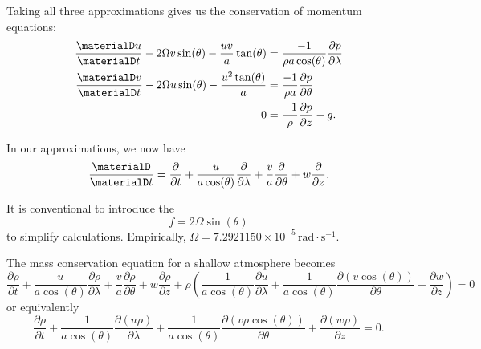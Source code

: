 \begin{prop}
Taking all three approximations gives us the conservation of momentum equations:
\begin{subequations}
  \begin{align}
    \frac{\materialD u}{\materialD t}
    - 2\Omega v\sin(\theta) - \frac{uv}{a}\tan(\theta)
    &= \frac{-1}{\rho a\cos(\theta)}\frac{\partial p}{\partial\lambda}\\
    \frac{\materialD v}{\materialD t}
    - 2\Omega u\sin(\theta) - \frac{u^{2}\tan(\theta)}{a}
    &= \frac{-1}{\rho a}\frac{\partial p}{\partial\theta} \\
    0 &= \frac{-1}{\rho}\frac{\partial p}{\partial z}-g.
  \end{align}
\end{subequations}
\end{prop}

\begin{note}
In our approximations, we now have
\begin{equation}
  \frac{\materialD}{\materialD t}=\frac{\partial}{\partial t} +
  \frac{u}{a\cos(\theta)}\frac{\partial}{\partial\lambda} +
  \frac{v}{a}\frac{\partial}{\partial\theta} + w\frac{\partial}{\partial z}.
\end{equation}
\end{note}

\begin{defn}
It is conventional to introduce the 
\begin{equation}
  f = 2\Omega\sin(\theta)
\end{equation}
to simplify calculations. Empirically, $\Omega=7.2921150\times10^{-5}\,\mathrm{rad}\cdot\mathrm{s}^{-1}$.
\end{defn}


\begin{prop}
The mass conservation equation for a shallow atmosphere becomes
\begin{equation}
  \frac{\partial\rho}{\partial t}
  + \frac{u}{a\cos(\theta)}\frac{\partial\rho}{\partial\lambda}
  + \frac{v}{a}\frac{\partial\rho}{\partial\theta}
  + w\frac{\partial\rho}{\partial z}
  + \rho\left(\frac{1}{a\cos(\theta)}\frac{\partial u}{\partial\lambda}
              + \frac{1}{a\cos(\theta)}\frac{\partial(v\cos(\theta))}{\partial\theta}
              + \frac{\partial w}{\partial z}
       \right)
  = 0
\end{equation}
or equivalently
\begin{equation}
  \frac{\partial\rho}{\partial t}
  + \frac{1}{a\cos(\theta)}\frac{\partial(u\rho)}{\partial\lambda}
  + \frac{1}{a\cos(\theta)}\frac{\partial(v\rho\cos(\theta))}{\partial\theta}
  + \frac{\partial(w\rho)}{\partial z}
  = 0.
\end{equation}
\end{prop}


